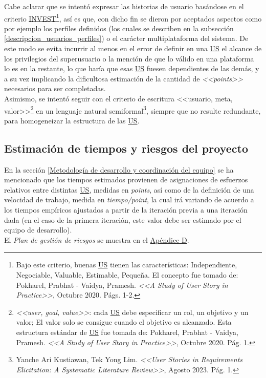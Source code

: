 \documentclass[a4paper, 12pt,twoside]{report}  %
\numberwithin{equation}{subsection} %
\begin{document}
Cabe aclarar que se intentó expresar las historias de usuario basándose en el criterio \hyperlink{INVEST}{INVEST}\footnote{Bajo este criterio, buenas \hyperlink{US}{US} tienen las características: Independiente, Negociable, Valuable, Estimable, Pequeña. El concepto fue tomado de: Pokharel, Prabhat - Vaidya, Pramesh. \textit{<<A Study of User Story in Practice>>}, Octubre 2020. Págs. 1-2.}, así es que, con dicho fin se dieron por aceptados aspectos como por ejemplo los perfiles definidos (los cuales se describen en la subsección \ref{descripcion_usuarios_perfiles}) o el carácter multiplataforma del sistema. De este modo se evita incurrir al menos en el error de definir en una \hyperlink{US}{US} el alcance de los privilegios del superusuario o la mención de que lo válido en una plataforma lo es en la restante, lo que haría que esas \hyperlink{US}{US} fuesen dependientes de las demás, y a su vez implicando la dificultosa estimación de la cantidad de \textit{<<points>>} necesarios para ser completadas.\\
\indent Asimismo, se intentó seguir con el criterio de escritura <<usuario, meta, valor>>\footnote{\textit{<<user, goal, value>>}: cada \hyperlink{US}{US} debe especificar un rol, un objetivo y un valor; El valor solo se consigue cuando el objetivo es alcanzado. Esta estructura estándar de \hyperlink{US}{US} fue tomada de: Pokharel, Prabhat - Vaidya, Pramesh. \textit{<<A Study of User Story in Practice>>}, Octubre 2020. Pág. 1.} en un lenguaje natural semiformal\footnote{Yanche Ari Kustiawan, Tek Yong Lim. \textit{<<User Stories in Requirements Elicitation: A Systematic Literature Review>>}, Agosto 2023. Pág. 1.}, siempre que no resulte redundante, para homogeneizar la estructura de las \hyperlink{US}{US}.


\subsection{Estimación de tiempos y riesgos del proyecto}
En la sección \ref{Metodología de desarrollo y coordinación del equipo} se ha mencionado que los tiempos estimados provienen de asignaciones de esfuerzos relativos entre distintas \hyperlink{US}{US}, medidas en \textit{points}, así como de la definición de una velocidad de trabajo, medida en \textit{tiempo/point}, la cual irá variando de acuerdo a los tiempos empíricos ajustados a partir de la iteración previa a una iteración dada (en el caso de la primera iteración, este valor debe ser estimado por el equipo de desarrollo).\\
\indent El \textit{Plan de gestión de riesgos} se muestra en el \hyperlink{apendice_d}{Apéndice D}.
\end{document}
